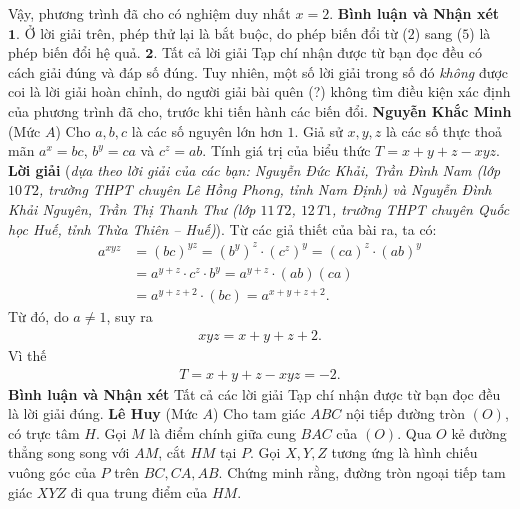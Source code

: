 \begin{multicols}{2}
	\vskip 0.05cm
	Vậy, phương trình đã cho có nghiệm duy nhất $x = 2$.
	\vskip 0.05cm
	\textbf{\color{thachthuctoanhoc}Bình luận và Nhận xét}
	\vskip 0.05cm
	$\pmb{1.}$ Ở lời giải trên, phép thử lại là bắt buộc, do phép biến đổi từ ($2$) sang ($5$) là phép biến đổi hệ quả.
	\vskip 0.05cm
	$\pmb{2.}$ Tất cả lời giải Tạp chí nhận được từ bạn đọc đều có cách giải đúng và đáp số đúng. Tuy nhiên, một số lời giải trong số đó \textit{không} được coi là lời giải hoàn chỉnh, do người giải bài quên (?) không tìm điều kiện xác định của phương trình đã cho, trước khi tiến hành các biến đổi.
	\vskip 0.05cm
	\hfill	\textbf{\color{thachthuctoanhoc}Nguyễn Khắc Minh}
	\vskip 0.05cm
	{}
	(Mức $A$) Cho $a,b,c$ là các số nguyên lớn hơn $1$. Giả sử $x,y,z$ là các số thực thoả mãn $a^x=bc$, $b^y=ca$ và $c^z=ab$. Tính giá trị của biểu thức $T=x+y+z-xyz$. 
	\vskip 0.05cm
	\textbf{\color{thachthuctoanhoc}Lời giải} (\textit{dựa theo lời giải của các bạn: Nguyễn Đức Khải, Trần Đình Nam (lớp $10$T$2$, trường THPT chuyên Lê Hồng Phong, tỉnh Nam Định) và Nguyễn Đình Khải Nguyên, Trần Thị Thanh Thư (lớp $11$T$2$, $12$T$1$, trường THPT chuyên Quốc học Huế, tỉnh Thừa Thiên -- Huế)}).
	\vskip 0.05cm
	Từ các giả thiết của bài ra, ta có:
	\begin{align*}
		{a^{xyz}} &= {\left( {bc} \right)^{yz}} = {\left( {{b^y}} \right)^z} \cdot {\left( {{c^z}} \right)^y} = {\left( {ca} \right)^z} \cdot {\left( {ab} \right)^y} \\[-0.5ex]
		&= {a^{y + z}} \cdot {c^z} \cdot {b^y} = {a^{y + z}} \cdot \left( {ab} \right)\left( {ca} \right) \\[-0.5ex]
		&= {a^{y + z + 2}} \cdot \left( {bc} \right) = {a^{x + y + z + 2}}.
	\end{align*}
	Từ đó, do $a \ne 1$, suy ra
	\begin{align*}
		xyz = x + y + z + 2.
	\end{align*}
	Vì thế
	\begin{align*}
		T = x + y + z - xyz = -2.
	\end{align*}
	\textbf{\color{thachthuctoanhoc}Bình luận và Nhận xét}
	\vskip 0.05cm
	Tất cả các lời giải Tạp chí nhận được từ bạn đọc đều là lời giải đúng.
	\vskip 0.05cm
	\hfill	\textbf{\color{thachthuctoanhoc}Lê Huy}
	\vskip 0.05cm
	{}
	(Mức $A$) Cho tam giác $ABC$ nội tiếp đường tròn $(O)$, có trực tâm $H$. Gọi $M$ là điểm chính giữa cung $BAC$ của $(O)$. Qua $O$ kẻ đường thẳng  song song với $AM$, cắt $HM$ tại $P$. Gọi $X,Y,Z$ tương ứng là hình chiếu vuông góc của $P$ trên $BC,CA,AB$. Chứng minh rằng, đường tròn ngoại tiếp tam giác $XYZ$ đi qua trung điểm của $HM.$

\end{multicols}
